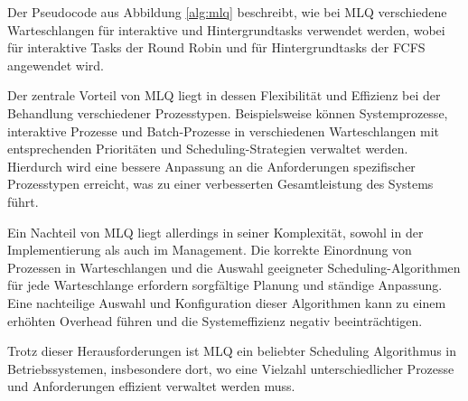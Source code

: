 Der Pseudocode aus Abbildung \ref{alg:mlq} beschreibt, wie bei \ac{MLQ} verschiedene Warteschlangen für interaktive und Hintergrundtasks verwendet werden, wobei für interaktive Tasks der Round Robin und für Hintergrundtasks der \ac{FCFS} angewendet wird.

Der zentrale Vorteil von \ac{MLQ} liegt in dessen Flexibilität und Effizienz bei der Behandlung verschiedener Prozesstypen. Beispielsweise können Systemprozesse, interaktive Prozesse und Batch-Prozesse in verschiedenen Warteschlangen mit entsprechenden Prioritäten und Scheduling-Strategien verwaltet werden. Hierdurch wird eine bessere Anpassung an die Anforderungen spezifischer Prozesstypen erreicht, was zu einer verbesserten Gesamtleistung des Systems führt. %

Ein Nachteil von \ac{MLQ} liegt allerdings in seiner Komplexität, sowohl in der Implementierung als auch im Management. Die korrekte Einordnung von Prozessen in Warteschlangen und die Auswahl geeigneter Scheduling-Algorithmen für jede Warteschlange erfordern sorgfältige Planung und ständige Anpassung. Eine nachteilige Auswahl und Konfiguration dieser Algorithmen kann zu einem erhöhten Overhead führen und die Systemeffizienz negativ beeinträchtigen. %

Trotz dieser Herausforderungen ist \ac{MLQ} ein beliebter Scheduling Algorithmus in Betriebssystemen, insbesondere dort, wo eine Vielzahl unterschiedlicher Prozesse und Anforderungen effizient verwaltet werden muss.

